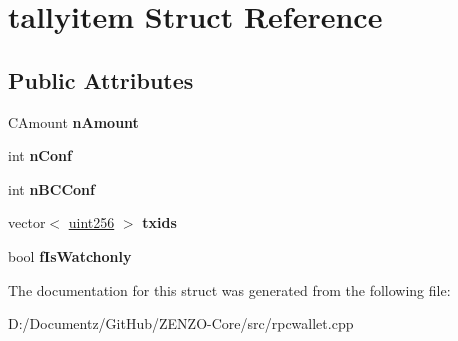 \hypertarget{structtallyitem}{}\section{tallyitem Struct Reference}
\label{structtallyitem}
\subsection*{Public Attributes}
\begin{DoxyCompactItemize}
\item 
\mbox{\label{structtallyitem_acc553807f036face8ef10eac9f277d79}} 
C\+Amount {\bfseries n\+Amount}
\item 
\mbox{\label{structtallyitem_a3b2facf2b1290561c5eabb22bc26c22d}} 
int {\bfseries n\+Conf}
\item 
\mbox{\label{structtallyitem_a26a2ae690f2b19636b2d87992ae7e123}} 
int {\bfseries n\+B\+C\+Conf}
\item 
\mbox{\label{structtallyitem_aa98973cace2783207b4d8bca7cc45a51}} 
vector$<$ \mbox{\hyperlink{classuint256}{uint256}} $>$ {\bfseries txids}
\item 
\mbox{\label{structtallyitem_a9e7a70ef944206ebb0f3a394eba92673}} 
bool {\bfseries f\+Is\+Watchonly}
\end{DoxyCompactItemize}


The documentation for this struct was generated from the following file\+:\begin{DoxyCompactItemize}
\item 
D\+:/\+Documentz/\+Git\+Hub/\+Z\+E\+N\+Z\+O-\/\+Core/src/rpcwallet.\+cpp\end{DoxyCompactItemize}
